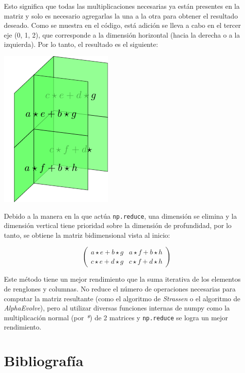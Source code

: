 \documentclass{article}
\begin{document}
Esto significa que todas las multiplicaciones necesarias ya están presentes en la matriz y solo es necesario agregarlas la una a la otra para obtener el resultado deseado. Como se muestra en el código, está adición se lleva a cabo en el tercer eje (0, 1, 2), que corresponde a la dimensión horizontal (hacia la derecha o a la izquierda). Por lo tanto, el resultado es el siguiente:

\begin{center}
    \includegraphics{6.pdf}
\end{center}

Debido a la manera en la que actúa \texttt{np.reduce}, una dimensión se elimina y la dimensión vertical tiene prioridad sobre la dimensión de profundidad, por lo tanto, se obtiene la matriz bidimensional vista al inicio:

$$
\begin{pmatrix}
    a \star e + b \star g & a \star f + b \star h \\
    c \star e + d \star g & c \star f + d \star h
\end{pmatrix}
$$

Este método tiene un mejor rendimiento que la suma iterativa de los elementos de renglones y columnas. No reduce el número de operaciones necesarias para computar la matriz resultante (como el algoritmo de \textit{Strassen} o el algoritmo de \textit{AlphaEvolve}), pero al utilizar diversas funciones internas de numpy como la multiplicación normal (por \textit{*}) de 2 matrices y \texttt{np.reduce} se logra un mejor rendimiento.

\section{Bibliografía}
\end{document}
